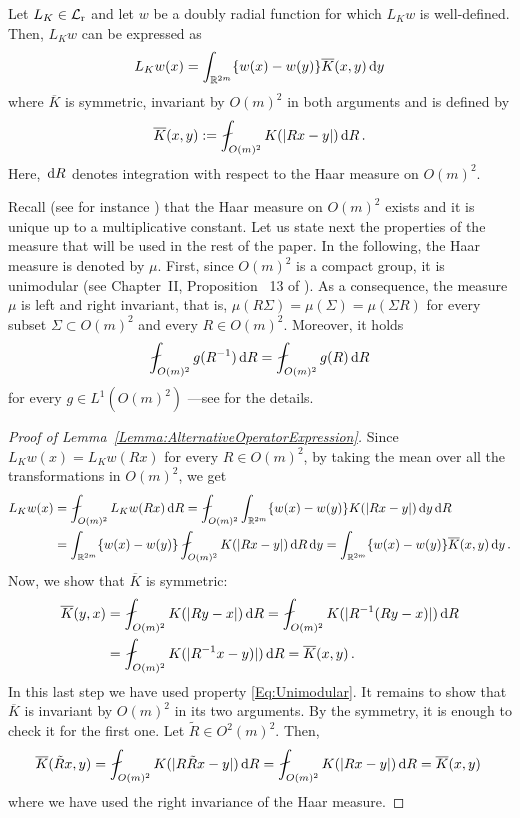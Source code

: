 \begin{lemma} \label{Lemma:AlternativeOperatorExpression}
Let $L_K \in \mathcal{L}_{\mathrm{r}}$ and let $w$ be a doubly radial function for which $L_K w$ is well-defined. Then, $L_K w$ can be expressed as
$$
L_K w(x) = \int_{\mathbb{R}^{2m}} \{w(x) - w(y)\} \overline{K}(x,y) \,\mathrm{d} y
$$
where $\overline{K}$ is symmetric, invariant by $O(m)^2$ in both arguments and is defined by
\begin{equation*}
\overline{K}(x,y) := \average_{O(m)^2} K(|Rx - y|)\d R\,.
\end{equation*}
Here, $\,\mathrm{d} R$ denotes integration with respect to the Haar measure on $O(m)^2$.
\end{lemma}

Recall (see for instance \cite{Nachbin}) that the Haar measure on $O(m)^2$ exists and it is unique up to a
multiplicative constant. Let us state next the properties of the measure that will be used in the rest of the
paper. In the following, the Haar measure is denoted by $\mu$. First, since $O(m)^2$ is a compact
group, it is unimodular (see Chapter~II, Proposition~ 13 of \cite{Nachbin}). As a consequence, the
measure $\mu$ is left and right invariant, that is, $\mu(R\Sigma) = \mu(\Sigma) = \mu(\Sigma R) $
for every subset $\Sigma \subset O(m)^2$ and every $R\in O(m)^2$. Moreover, it holds
\begin{equation}
\label{Eq:Unimodular}
\average_{O(m)^2} g(R^{-1}) \d R = \average_{O(m)^2} g(R) \d R
\end{equation}	
for every $g\in L^1(O(m)^2)$ ---see \cite{Nachbin} for the details.

\begin{proof}[Proof of Lemma~\ref{Lemma:AlternativeOperatorExpression}]
Since $L_K w (x) = L_K w (Rx)$ for every $R\in O(m)^2$, by taking the mean over all the transformations in $O(m)^2$, we get
\begin{align*}
L_K w(x) &= \average_{O(m)^2} L_K w(Rx)\d R =  \average_{O(m)^2} \int_{\R^{2m}} \{w(x) - w(y)\}K(|Rx - y|) \d y \d R\\
&= \int_{\R^{2m}} \{w(x) - w(y)\}  \average_{O(m)^2} K(|Rx - y|) \d R  \d y = \int_{\R^{2m}} \{w(x) - w(y)\}  \overline{K}(x,y) \d y\,.
\end{align*}
Now, we show that $\overline{K}$ is symmetric:
\begin{align*}
\overline{K}(y,x) &= \average_{O(m)^2} K(|R y - x|)\d R = \average_{O(m)^2} K(|R^{-1} (R y - x)|)\d R \\
&= \average_{O(m)^2} K(|R^{-1}x-y)|)\d R = \overline{K}(x,y)\,.
\end{align*}
In this last step we have used property \eqref{Eq:Unimodular}. It remains to show that
$\overline{K}$ is invariant by $O(m)^2$ in its two arguments. By the symmetry, it is enough to
check it for the first one. Let $\tilde{R} \in O^2(m)^2$. Then,
$$
\overline{K} (\tilde{R}x, y) = \average_{O(m)^2} K(|R \tilde{R} x - y|)\d R  = \average_{O(m)^2} K(|R x - y|)\d R = \overline{K} (x, y)\,
$$
where we have used the right invariance of the Haar measure.
\end{proof}



